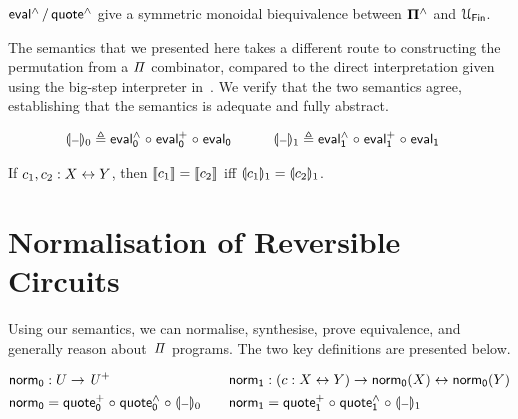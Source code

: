 \begin{proposition}
  $\evalh/\quoteh$ give a symmetric monoidal biequivalence between $\mathbf{\Pi^{\wedge}}$ and $\UFin$.
\end{proposition}

The semantics that we presented here takes a different route to constructing the permutation from a $\mathit{\Pi}$
combinator, compared to the direct interpretation given using the big-step interpreter in~. We
verify that the two semantics agree, establishing that the semantics is adequate and fully abstract.

\begin{definition}
  \begin{gather*}
    \begin{aligned}
      \gdenot{\blank}_{0} &\defeq \evalh_{0} \comp \evalp_{0} \comp \evalt_{0}
    \end{aligned}
    \qquad
    \begin{aligned}
      \gdenot{\blank}_{1} &\defeq \evalh_{1} \comp \evalp_{1} \comp \evalt_{1}
    \end{aligned}
  \end{gather*}
\end{definition}

\begin{proposition}
  If $c_1, c_2 : X \mathrel{\leftrightarrow} Y$, then $\llbracket c_1\rrbracket = \llbracket c_2\rrbracket$ iff $\llparenthesis c_1\rrparenthesis_{1} = \llparenthesis c_2\rrparenthesis_{1}$.
\end{proposition}

\section{Normalisation of Reversible Circuits}
\label{sec:applications}

Using our semantics, we can normalise, synthesise, prove equivalence, and generally reason about~$\mathit{\Pi}$
programs. The two key definitions are presented below.

\begin{definition}
  \begin{gather*}
    \begin{aligned}
      \normt_{0} & : U \to \UPlus                                            \\
      \normt_{0} & = \quotep_{0} \comp \quoteh_{0} \comp \gdenot{\blank}_{0}
    \end{aligned}
    \qquad
    \begin{aligned}
      \normt_{1} & : (c : X \iso Y) \to \normt_{0}(X) \iso \normt_{0}(Y)     \\
      \normt_{1} & = \quotep_{1} \comp \quoteh_{1} \comp \gdenot{\blank}_{1}
    \end{aligned}
  \end{gather*}
\end{definition}

